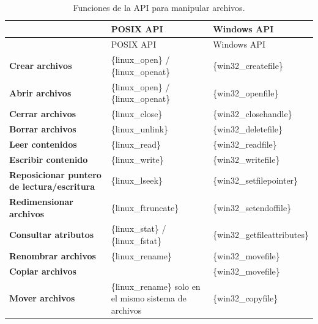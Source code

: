 \begin{longtable}[]{@{}
  >{\raggedright\arraybackslash}p{}
  >{\raggedright\arraybackslash}p{}
  >{\raggedright\arraybackslash}p{}@{}}
\caption{Funciones de la API para manipular archivos.}\tabularnewline
\toprule\noalign{}
\begin{minipage}[b]{\linewidth}\raggedright
\end{minipage} & \begin{minipage}[b]{\linewidth}\raggedright
POSIX API
\end{minipage} & \begin{minipage}[b]{\linewidth}\raggedright
Windows API
\end{minipage} \\
\midrule\noalign{}
\endfirsthead
\toprule\noalign{}
\begin{minipage}[b]{\linewidth}\raggedright
\end{minipage} & \begin{minipage}[b]{\linewidth}\raggedright
POSIX API
\end{minipage} & \begin{minipage}[b]{\linewidth}\raggedright
Windows API
\end{minipage} \\
\midrule\noalign{}
\endhead
\bottomrule\noalign{}
\endlastfoot
\textbf{Crear archivos} & \{linux\_open\} / \{linux\_openat\} &
\{win32\_createfile\} \\
\textbf{Abrir archivos} & \{linux\_open\} / \{linux\_openat\} &
\{win32\_openfile\} \\
\textbf{Cerrar archivos} & \{linux\_close\} & \{win32\_closehandle\} \\
\textbf{Borrar archivos} & \{linux\_unlink\} & \{win32\_deletefile\} \\
\textbf{Leer contenidos} & \{linux\_read\} & \{win32\_readfile\} \\
\textbf{Escribir contenido} & \{linux\_write\} & \{win32\_writefile\} \\
\textbf{Reposicionar puntero de lectura/escritura} & \{linux\_lseek\} &
\{win32\_setfilepointer\} \\
\textbf{Redimensionar archivos} & \{linux\_ftruncate\} &
\{win32\_setendoffile\} \\
\textbf{Consultar atributos} & \{linux\_stat\} / \{linux\_fstat\} &
\{win32\_getfileattributes\} \\
\textbf{Renombrar archivos} & \{linux\_rename\} & \{win32\_movefile\} \\
\textbf{Copiar archivos} & & \{win32\_movefile\} \\
\textbf{Mover archivos} & \{linux\_rename\} {solo en el mismo sistema de
archivos} & \{win32\_copyfile\} \\
\end{longtable}

